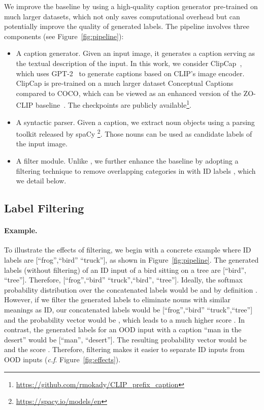 \documentclass{article}
\def\cf{\emph{c.f}. }
\begin{document}
We improve the baseline by using a high-quality caption generator pre-trained on much larger datasets, which not only saves computational overhead but can potentially improve the quality of generated labels.  The pipeline involves three components (see Figure~\ref{fig:pipeline}):
\begin{itemize}
    \item A caption generator. Given an input image, it generates a caption serving as the textual description of the input.  In this work, we consider ClipCap~\cite{mokady2021ClipCap}, which uses GPT-2~\cite{radford2019language} to generate captions based on CLIP's image encoder. ClipCap is pre-trained on a much larger dataset Conceptual Captions~\cite{ng2020understanding} compared to COCO, which can be viewed as an enhanced version of the ZO-CLIP baseline~\cite{esmaeilpour2022zero}. The checkpoints are publicly available\footnote{\url{https://github.com/rmokady/CLIP_prefix_caption}}. 
    \item  A syntactic parser. Given a caption, we extract noun objects using a parsing toolkit released by spaCy \footnote{\url{https://spacy.io/models/en}}. Those nouns can be used as candidate labels  of the input image.
    \item A filter module. Unlike \cite{esmaeilpour2022zero}, we further enhance the baseline by adopting a filtering technique to remove overlapping categories in  with ID labels , which we detail below.
\end{itemize}

\subsection{Label Filtering}
\label{sec:example}
\paragraph{Example.} To illustrate the effects of filtering, we begin with a concrete example where ID labels are [``frog'',``bird'' ``truck''], as shown in Figure~\ref{fig:pipeline}. The generated labels (without filtering) of an ID input of a bird sitting on a tree are [``bird'', ``tree'']. Therefore, [``frog'',``bird'' ``truck'',``bird'', ``tree'']. 
 Ideally, the softmax probability distribution over the concatenated labels would be  and by definition . However, if we filter the generated labels to eliminate nouns with similar meanings as ID, our concatenated labels would be [``frog'',``bird'' ``truck'',``tree''] and the probability vector would be , which leads to a much higher score . In contrast, the generated labels for an OOD input with a caption ``man in the desert'' would be [``man'', ``desert'']. The resulting probability vector would be   and the score . Therefore, filtering makes it easier to separate ID inputs from OOD inputs (\cf Figure~\ref{fig:effects}). 
\end{document}
